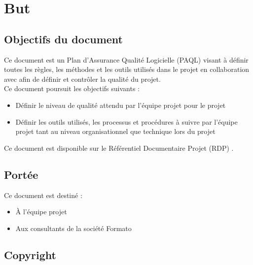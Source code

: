 \documentclass[a4paper,11pt,titlepage]{article}
\begin{document}
\tableofcontents
\newpage

% 
\section{But}%
\subsection{Objectifs du document}%
Ce document est un Plan d'Assurance Qualité Logicielle (PAQL) visant à définir toutes les règles,
les méthodes et les outils utilisés dans le projet {\projectName} en collaboration avec {\clientName} afin de définir et contrôler la qualité du projet.\\
Ce document poursuit les objectifs suivants :
\begin{itemize}
    \item Définir le niveau de qualité attendu par l'équipe projet pour le projet {\projectName}
    \item Définir les outils utilisés, les processus et procédures à suivre par l'équipe
          projet tant au niveau organisationnel que technique lors du projet {\projectName}
\end{itemize}
Ce document est disponible sur le Référentiel Documentaire Projet (RDP) \cite[{}]{PAQL}.

\subsection{Portée}%
Ce document est destiné :
\begin{itemize}
    \item À l'équipe projet
    \item Aux consultants de la société Formato
\end{itemize}

\subsection{Copyright}%

\end{document}
